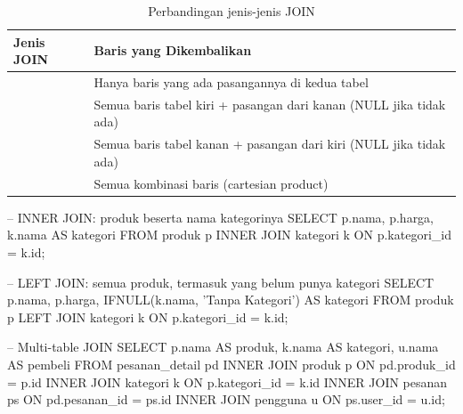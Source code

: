 \begin{table}[ht]
\centering
\begin{tabular}{|P{3cm}|P{9.5cm}|}
\hline
\textbf{Jenis JOIN} & \textbf{Baris yang Dikembalikan} \\
\hline
{} & Hanya baris yang ada pasangannya di kedua tabel \\
\hline
{} & Semua baris tabel kiri + pasangan dari kanan (NULL jika tidak ada) \\
\hline
{} & Semua baris tabel kanan + pasangan dari kiri (NULL jika tidak ada) \\
\hline
{} & Semua kombinasi baris (cartesian product) \\
\hline
\end{tabular}
\caption{Perbandingan jenis-jenis JOIN}
\end{table}

\begin{webcode}[language=SQL, caption={Contoh penggunaan JOIN}]
-- INNER JOIN: produk beserta nama kategorinya
SELECT p.nama, p.harga, k.nama AS kategori
FROM produk p
INNER JOIN kategori k ON p.kategori_id = k.id;

-- LEFT JOIN: semua produk, termasuk yang belum punya kategori
SELECT p.nama, p.harga, IFNULL(k.nama, 'Tanpa Kategori') AS kategori
FROM produk p
LEFT JOIN kategori k ON p.kategori_id = k.id;

-- Multi-table JOIN
SELECT p.nama AS produk, k.nama AS kategori, u.nama AS pembeli
FROM pesanan_detail pd
INNER JOIN produk p ON pd.produk_id = p.id
INNER JOIN kategori k ON p.kategori_id = k.id
INNER JOIN pesanan ps ON pd.pesanan_id = ps.id
INNER JOIN pengguna u ON ps.user_id = u.id;
\end{webcode}

